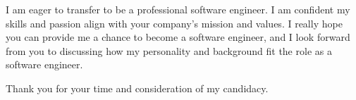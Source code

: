\documentclass[11pt, a4paper]{awesome-cv}
\begin{document}
\begin{cvletter}
I am eager to  transfer to be a professional software engineer. I am confident my skills and passion align with your company's mission and values. I really hope you can provide me a chance to become a software engineer, and I look forward from you to discussing how my personality and background fit the role as a software engineer.

Thank you for your time and consideration of my candidacy.

\end{cvletter}


\makeletterclosing
\end{document}
